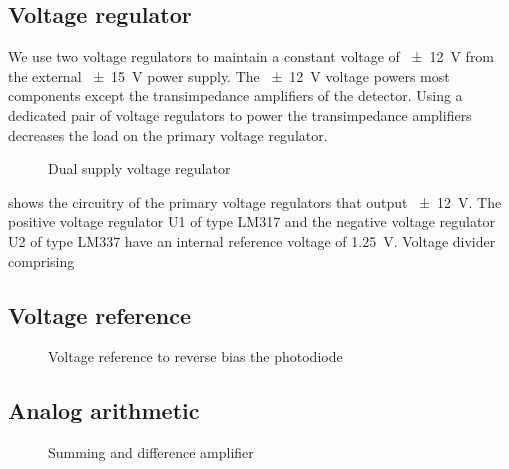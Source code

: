 \subsection{Voltage regulator}

We use two voltage regulators to maintain a constant voltage of \SI{\pm12}{\volt} from the external \SI{\pm15}{\volt} power supply. The \SI{\pm12}{\volt} voltage powers most components except the transimpedance amplifiers of the detector.
Using a dedicated pair of voltage regulators to power the transimpedance amplifiers decreases the load on the primary voltage regulator.

\begin{figure}[H]
	\centering
	
	\caption{Dual supply voltage regulator}\label{fig:voltage_regulator}
\end{figure}
 shows the circuitry of the primary voltage regulators that output \SI{\pm12}{\volt}.
The positive voltage regulator U1 of type LM317 and the negative voltage regulator U2 of type LM337 have an internal reference voltage of \SI{1.25}{\volt}.
Voltage divider comprising

\subsection{Voltage reference}

\begin{figure}[H]
	\centering
	
	\caption{Voltage reference to reverse bias the photodiode}\label{fig:voltage_reference}
\end{figure}

\subsection{Analog arithmetic}

\begin{figure}[H]
	\centering
	
	\caption{Summing and difference amplifier}\label{fig:amplifier_arithmetic}
\end{figure}
